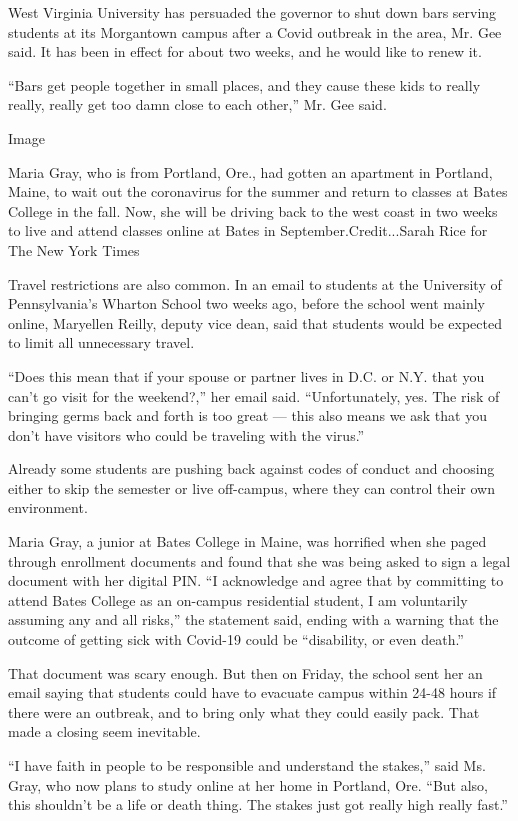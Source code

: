 West Virginia University has persuaded the governor to shut down bars
serving students at its Morgantown campus after a Covid outbreak in the
area, Mr. Gee said. It has been in effect for about two weeks, and he
would like to renew it.

``Bars get people together in small places, and they cause these kids to
really really, really get too damn close to each other,'' Mr. Gee said.

Image

Maria Gray, who is from Portland, Ore., had gotten an apartment in
Portland, Maine, to wait out the coronavirus for the summer and return
to classes at Bates College in the fall. Now, she will be driving back
to the west coast in two weeks to live and attend classes online at
Bates in September.Credit...Sarah Rice for The New York Times

Travel restrictions are also common. In an email to students at the
University of Pennsylvania's Wharton School two weeks ago, before the
school went mainly online, Maryellen Reilly, deputy vice dean, said that
students would be expected to limit all unnecessary travel.

``Does this mean that if your spouse or partner lives in D.C. or N.Y.
that you can't go visit for the weekend?,'' her email said.
``Unfortunately, yes. The risk of bringing germs back and forth is too
great --- this also means we ask that you don't have visitors who could
be traveling with the virus.''

Already some students are pushing back against codes of conduct and
choosing either to skip the semester or live off-campus, where they can
control their own environment.

Maria Gray, a junior at Bates College in Maine, was horrified when she
paged through enrollment documents and found that she was being asked to
sign a legal document with her digital PIN. ``I acknowledge and agree
that by committing to attend Bates College as an on-campus residential
student, I am voluntarily assuming any and all risks,'' the statement
said, ending with a warning that the outcome of getting sick with
Covid-19 could be ``disability, or even death.''

That document was scary enough. But then on Friday, the school sent her
an email saying that students could have to evacuate campus within 24-48
hours if there were an outbreak, and to bring only what they could
easily pack. That made a closing seem inevitable.

``I have faith in people to be responsible and understand the stakes,''
said Ms. Gray, who now plans to study online at her home in Portland,
Ore. ``But also, this shouldn't be a life or death thing. The stakes
just got really high really fast.''

